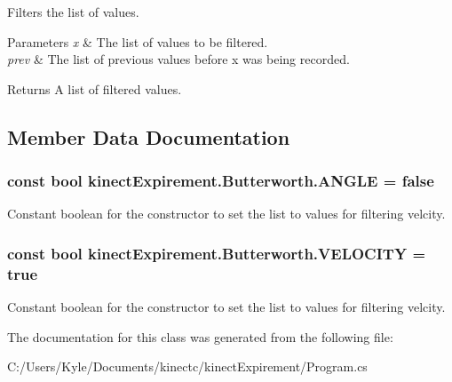 Filters the list of values. 


\begin{DoxyParams}{Parameters}
{\em x} & The list of values to be filtered. \\
\hline
{\em prev} & The list of previous values before {\ttfamily x} was being recorded. \\
\hline
\end{DoxyParams}
\begin{DoxyReturn}{Returns}
A list of filtered values. 
\end{DoxyReturn}


\subsection{Member Data Documentation}
\subsubsection[{\texorpdfstring{A\+N\+G\+LE}{ANGLE}}]{\setlength{\rightskip}{0pt plus 5cm}const bool kinect\+Expirement.\+Butterworth.\+A\+N\+G\+LE = false}\hypertarget{classkinect_expirement_1_1_butterworth_ac991123445c654cb0da7d7841e313b2c}{}\label{classkinect_expirement_1_1_butterworth_ac991123445c654cb0da7d7841e313b2c}


Constant boolean for the constructor to set the list to values for filtering velcity. 

\subsubsection[{\texorpdfstring{V\+E\+L\+O\+C\+I\+TY}{VELOCITY}}]{\setlength{\rightskip}{0pt plus 5cm}const bool kinect\+Expirement.\+Butterworth.\+V\+E\+L\+O\+C\+I\+TY = true}\hypertarget{classkinect_expirement_1_1_butterworth_afc717929ffc8d554b7e0263e2b06806a}{}\label{classkinect_expirement_1_1_butterworth_afc717929ffc8d554b7e0263e2b06806a}


Constant boolean for the constructor to set the list to values for filtering velcity. 



The documentation for this class was generated from the following file\+:\begin{DoxyCompactItemize}
\item 
C\+:/\+Users/\+Kyle/\+Documents/kinectc/kinect\+Expirement/Program.\+cs\end{DoxyCompactItemize}
